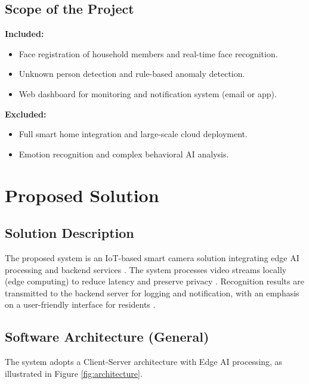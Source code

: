 \documentclass[12pt,a4paper]{article}
\begin{document}
\subsection{Scope of the Project}
\textbf{Included:}
\begin{itemize}
    \item Face registration of household members and real-time face recognition.
    \item Unknown person detection and rule-based anomaly detection.
    \item Web dashboard for monitoring and notification system (email or app).
\end{itemize}
\textbf{Excluded:}
\begin{itemize}
    \item Full smart home integration and large-scale cloud deployment.
    \item Emotion recognition and complex behavioral AI analysis.
\end{itemize}

\section{Proposed Solution}
\subsection{Solution Description}
The proposed system is an IoT-based smart camera solution integrating edge AI processing and backend services \cite{sarimole_2024}. The system processes video streams locally (edge computing) to reduce latency and preserve privacy \cite{sahu_2023}. Recognition results are transmitted to the backend server for logging and notification, with an emphasis on a user-friendly interface for residents \cite{ux_iot_2024}.

\subsection{Software Architecture (General)}
The system adopts a Client-Server architecture with Edge AI processing, as illustrated in Figure \ref{fig:architecture}.
\end{document}
